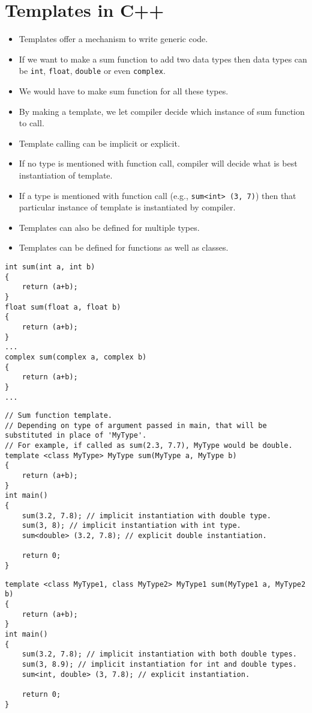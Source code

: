 \documentclass[12pt,a4paper]{article}
\begin{document}
\section{Templates in C++}
\begin{itemize}
\item Templates offer a mechanism to write generic code.
\item If we want to make a sum function to add two data types then data types can be \verb|int|, \verb|float|, \verb|double| or even \verb|complex|.
\item We would have to make sum function for all these types.
\item By making a template, we let compiler decide which instance of sum function to call.
\item Template calling can be implicit or explicit.
\item If no type is mentioned with function call, compiler will decide what is best instantiation of template.
\item If a type is mentioned with function call (e.g., \verb|sum<int> (3, 7)|) then that particular instance of template is instantiated by compiler.
\item Templates can also be defined for multiple types.
\item Templates can be defined for functions as well as classes.
\end{itemize}
\begin{lstlisting}[caption={Traditional way of writing sum function}]
int sum(int a, int b)
{
	return (a+b);
}
float sum(float a, float b)
{
	return (a+b);
}
...
complex sum(complex a, complex b)
{
	return (a+b);
}
...
\end{lstlisting}
\begin{lstlisting}[caption={Sum function template}]
// Sum function template.
// Depending on type of argument passed in main, that will be substituted in place of 'MyType'.
// For example, if called as sum(2.3, 7.7), MyType would be double.
template <class MyType> MyType sum(MyType a, MyType b)
{
	return (a+b);
}
int main()
{
	sum(3.2, 7.8); // implicit instantiation with double type.
	sum(3, 8); // implicit instantiation with int type.
	sum<double> (3.2, 7.8); // explicit double instantiation.
	
	return 0;
}
\end{lstlisting}
\begin{lstlisting}[caption={Sum function template for mixed types}]
template <class MyType1, class MyType2> MyType1 sum(MyType1 a, MyType2 b)
{
	return (a+b);
}
int main()
{
	sum(3.2, 7.8); // implicit instantiation with both double types.
	sum(3, 8.9); // implicit instantiation for int and double types.
	sum<int, double> (3, 7.8); // explicit instantiation.
	
	return 0;
}
\end{lstlisting}


\end{document}
